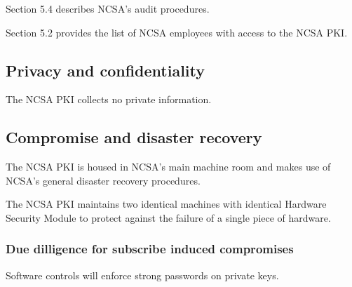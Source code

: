 \documentclass[10pt]{article}
\begin{document}
Section 5.4 describes NCSA's audit procedures.

Section 5.2 provides the list of NCSA employees with access to the
NCSA PKI.

\subsection{Privacy and confidentiality}

The NCSA PKI collects no private information.

\subsection{Compromise and disaster recovery}

The NCSA PKI is housed in NCSA's main machine room and makes use of
NCSA's general disaster recovery procedures.

The NCSA PKI maintains two identical machines with identical Hardware
Security Module to protect against the failure of a single piece of
hardware.

\subsubsection{Due dilligence for subscribe induced compromises}

Software controls will enforce strong passwords on private keys.

%
\end{document}
